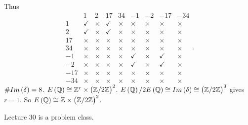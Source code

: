 Thus
$$
\begin{array}{c|cccc|cccc}
& 1 & 2 & 17 & 34 & -1 & -2 & -17 & -34 \\
\hline
1 & \checkmark & \times & \checkmark & \times & \times & \times & \times & \times \\
2 & \checkmark & \times & \checkmark & \times & \times & \times & \times & \times \\
17 & \times & \times & \times & \times & \times & \times & \times & \times \\
34 & \times & \times & \times & \times & \times & \times & \times & \times \\
\hline
-1 & \times & \times & \times & \times & \checkmark & \times & \checkmark & \times \\
-2 & \times & \times & \times & \times & \checkmark & \times & \checkmark & \times \\
-17 & \times & \times & \times & \times & \times & \times & \times & \times \\
-34 & \times & \times & \times & \times & \times & \times & \times & \times
\end{array}.
$$
$ \#Im\br{\delta} = 8 $. $ E\br{\Q} \cong \Z^r \times \br{\Z / 2\Z}^2 $. $ E\br{\Q} / 2E\br{\Q} \cong Im\br{\delta} \cong \br{\Z / 2\Z}^3 $ gives $ r = 1 $. So $ E\br{\Q} \cong \Z \times \br{\Z / 2\Z}^2 $.


Lecture 30 is a problem class.

